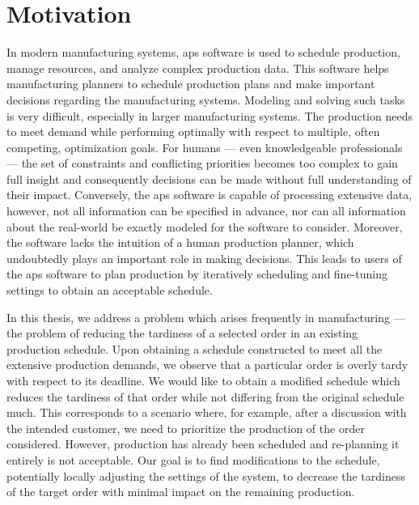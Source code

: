  \label{chap:introduction}

\section*{Motivation} \label{sec:introduction/motivation}

In modern manufacturing systems, \ac{aps} software is used to schedule production,
manage resources, and analyze complex production data.
This software helps manufacturing planners to schedule production plans
and make important decisions regarding the manufacturing systems.
Modeling and solving such tasks is very difficult, especially in larger manufacturing systems.
The production needs to meet demand while performing optimally with respect to multiple,
often competing, optimization goals.
For humans --- even knowledgeable professionals ---
the set of constraints and conflicting priorities becomes too complex to gain full insight
and consequently decisions can be made without full understanding of their impact.
Conversely, the \ac{aps} software is capable of processing extensive data,
however, not all information can be specified in advance,
nor can all information about the real-world be exactly modeled for the software to consider.
Moreover, the software lacks the intuition of a human production planner,
which undoubtedly plays an important role in making decisions.
This leads to users of the \ac{aps} software to plan production by iteratively
scheduling and fine-tuning settings to obtain an acceptable schedule.

In this thesis, we address a problem which arises frequently in manufacturing ---
the problem of reducing the tardiness of a selected order in an existing production schedule.
Upon obtaining a schedule constructed to meet all the extensive production demands,
we observe that a particular order is overly tardy with respect to its deadline.
We would like to obtain a modified schedule which reduces the tardiness of that order
while not differing from the original schedule much.
This corresponds to a scenario where, for example, after a discussion with the intended customer,
we need to prioritize the production of the order considered.
However, production has already been scheduled and re-planning it entirely is not acceptable.
Our goal is to find modifications to the schedule,
potentially locally adjusting the settings of the system,
to decrease the tardiness of the target order with minimal impact on the remaining production.

